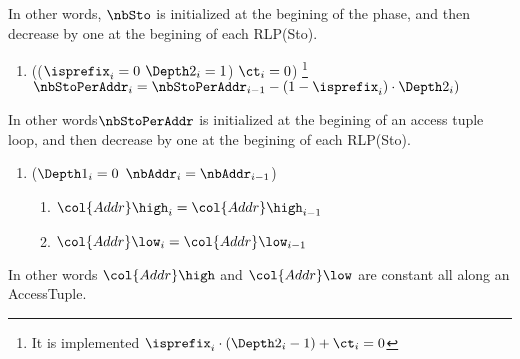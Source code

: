 In other words, $\nbSto$ is initialized at the begining of the phase, and then decrease by one at the begining of each RLP(Sto).
\begin{enumerate}[resume]
	\item \If (($\isprefix_{i}=0$ \Or $\Depth2_{i}=1$) \et $\ct_{i}=0$) \footnote{It is implemented \If $\isprefix_{i} \cdot (\Depth2_{i}-1) +\ct_{i} =0$ \Then} \Then $\nbStoPerAddr_{i} = \nbStoPerAddr_{i-1} - (1- \isprefix_{i}) \cdot \Depth2_{i})$
\end{enumerate}
In other words$\nbStoPerAddr$ is initialized at the begining of an access tuple loop, and then decrease by one at the begining of each RLP(Sto).
\begin{enumerate}[resume]
	\item \If ($\Depth1_{i}=0$ \et $\nbAddr_{i}=\nbAddr_{i-1}$) \Then 
	\begin{enumerate}
		\item $\col{Addr}\high_{i} = \col{Addr}\high_{i-1}$
		\item $\col{Addr}\low_{i} = \col{Addr}\low_{i-1}$
	\end{enumerate}
\end{enumerate}
In other words $\col{Addr}\high$ and $\col{Addr}\low$ are constant all along an AccessTuple.

